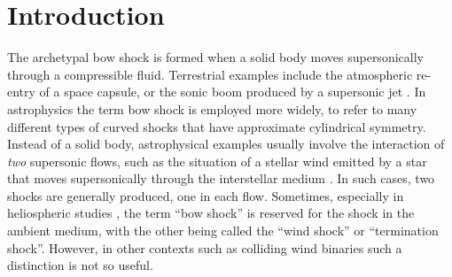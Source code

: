 \nocite{Henney:2018a}

\section{Introduction}
\label{sec:intro}



The archetypal bow shock is formed when a solid body moves
supersonically through a compressible fluid.  Terrestrial examples
include the atmospheric re-entry of a space capsule, or the sonic boom
produced by a supersonic jet \citep{van-Dyke:1982a}.  In astrophysics
the term bow shock is employed more widely, to refer to many different
types of curved shocks that have approximate cylindrical symmetry.
Instead of a solid body, astrophysical examples usually involve the
interaction of \emph{two} supersonic flows, such as the situation of a
stellar wind emitted by a star that moves supersonically through the
interstellar medium \citep{van-Buren:1988a, Kobulnicky:2010a,
  van-Marle:2011a, Mackey:2012b, Mackey:2015a}.  In such cases, two
shocks are generally produced, one in each flow.  Sometimes,
especially in heliospheric studies \citep{Zank:1999a, Scherer:2014a},
the term ``bow shock'' is reserved for the shock in the ambient
medium, with the other being called the ``wind shock'' or
``termination shock''.  However, in other contexts such as colliding
wind binaries \citep{Stevens:1992a, Gayley:2009a} such a distinction
is not so useful.  


